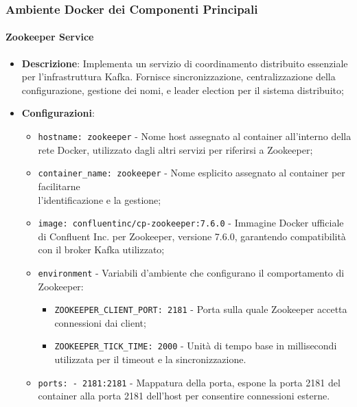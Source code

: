 \documentclass[10pt]{article}
\begin{document}
        \subsubsection{Ambiente Docker dei Componenti Principali}

        \paragraph{Zookeeper Service}
        \begin{itemize} 
        \item \textbf{Descrizione}: Implementa un servizio di coordinamento distribuito essenziale per l'infrastruttura Kafka. Fornisce sincronizzazione, centralizzazione della configurazione, gestione dei nomi, e leader election per il sistema distribuito;
        \item \textbf{Configurazioni}:
        \begin{itemize}
            \item \texttt{hostname: zookeeper} - Nome host assegnato al container all'interno della rete Docker, utilizzato dagli altri servizi per riferirsi a Zookeeper;
            \item \texttt{container\_name: zookeeper} - Nome esplicito assegnato al container per facilitarne\\ l'identificazione e la gestione;
            \item \texttt{image: confluentinc/cp-zookeeper:7.6.0} - Immagine Docker ufficiale di Confluent Inc. per Zookeeper, versione 7.6.0, garantendo compatibilità con il broker Kafka utilizzato;
            \item \texttt{environment} - Variabili d'ambiente che configurano il comportamento di Zookeeper:
            \begin{itemize}
                \item \texttt{ZOOKEEPER\_CLIENT\_PORT: 2181} - Porta sulla quale Zookeeper accetta connessioni dai client;
                \item \texttt{ZOOKEEPER\_TICK\_TIME: 2000} - Unità di tempo base in millisecondi utilizzata per il timeout e la sincronizzazione.
            \end{itemize}
            \item \texttt{ports: - 2181:2181} - Mappatura della porta, espone la porta 2181 del container alla porta 2181 dell'host per consentire connessioni esterne.
        \end{itemize}


\end{itemize}
\end{document}
